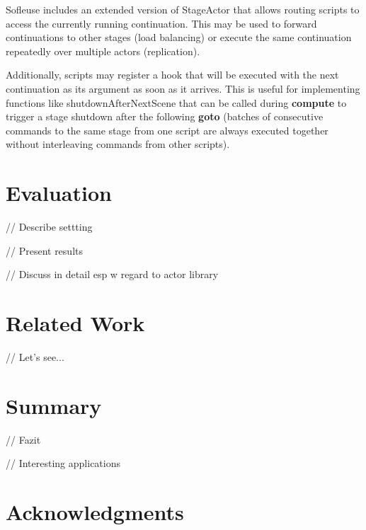 \documentclass{sig-alternate}
\begin{document}
Sofleuse includes an extended version of StageActor that allows routing scripts to 
access the currently running continuation.  This may be used to forward continuations
to other stages (load balancing) or execute the same continuation repeatedly over multiple
actors (replication).                               

Additionally, scripts may register a hook that will be executed with the next continuation as its
argument as soon as it arrives. This is useful for implementing functions like
shutdownAfterNextScene that can be called during \textbf{compute} to trigger a stage shutdown after
the following \textbf{goto} (batches of consecutive commands to the same stage from one script 
are always executed together without interleaving commands from other scripts).

\section{Evaluation}

// Describe settting

// Present results

// Discuss in detail esp w regard to actor library


\section{Related Work}

// Let's see...

\section{Summary}
                  
// Fazit

// Interesting applications

\section{Acknowledgments}


%  
\end{document}

